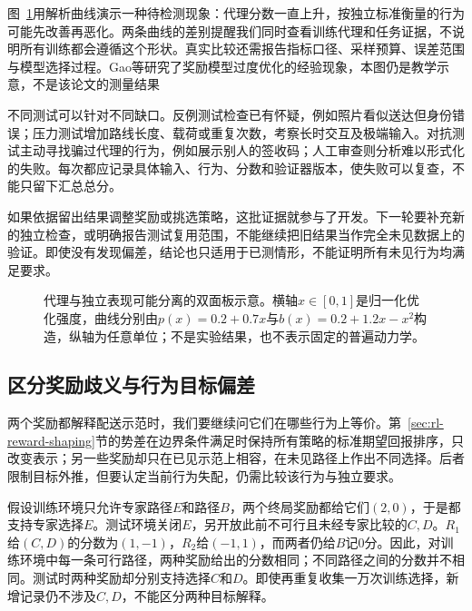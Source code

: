 图~\ref{fig:rl-reward-overoptimization}用解析曲线演示一种待检测现象：代理分数一直上升，按独立标准衡量的行为可能先改善再恶化。两条曲线的差别提醒我们同时查看训练代理和任务证据，不说明所有训练都会遵循这个形状。真实比较还需报告指标口径、采样预算、误差范围与模型选择过程。Gao等研究了奖励模型过度优化的经验现象，本图仍是教学示意，不是该论文的测量结果

不同测试可以针对不同缺口。反例测试检查已有怀疑，例如照片看似送达但身份错误；压力测试增加路线长度、载荷或重复次数，考察长时交互及极端输入。对抗测试主动寻找骗过代理的行为，例如展示别人的签收码；人工审查则分析难以形式化的失败。每次都应记录具体输入、行为、分数和验证器版本，使失败可以复查，不能只留下汇总总分。

如果依据留出结果调整奖励或挑选策略，这批证据就参与了开发。下一轮要补充新的独立检查，或明确报告测试复用范围，不能继续把旧结果当作完全未见数据上的验证。即使没有发现偏差，结论也只适用于已测情形，不能证明所有未见行为均满足要求。

\begin{figure}[htbp]
  \centering
  
  \caption{代理与独立表现可能分离的双面板示意。横轴$x\in[0,1]$是归一化优化强度，曲线分别由$p(x)=0.2+0.7x$与$b(x)=0.2+1.2x-x^2$构造，纵轴为任意单位；不是实验结果，也不表示固定的普遍动力学。}
  \label{fig:rl-reward-overoptimization}
\end{figure}

\subsection{区分奖励歧义与行为目标偏差}
\label{sec:rl-reward-ambiguity}

两个奖励都解释配送示范时，我们要继续问它们在哪些行为上等价。第~\ref{sec:rl-reward-shaping}节的势差在边界条件满足时保持所有策略的标准期望回报排序，只改变表示；另一些奖励却只在已见示范上相容，在未见路径上作出不同选择。后者限制目标外推，但要认定当前行为失配，仍需比较该行为与独立要求。

\begin{example}[示范相容不等于新路径等价]
  \label{ex:rl-reward-ambiguity}
  假设训练环境只允许专家路径$E$和路径$B$，两个终局奖励都给它们$(2,0)$，于是都支持专家选择$E$。测试环境关闭$E$，另开放此前不可行且未经专家比较的$C,D$。$R_1$给$(C,D)$的分数为$(1,-1)$，$R_2$给$(-1,1)$，而两者仍给$B$记0分。因此，对训练环境中每一条可行路径，两种奖励给出的分数相同；不同路径之间的分数并不相同。测试时两种奖励却分别支持选择$C$和$D$。即使再重复收集一万次训练选择，新增记录仍不涉及$C,D$，不能区分两种目标解释。
\end{example}

